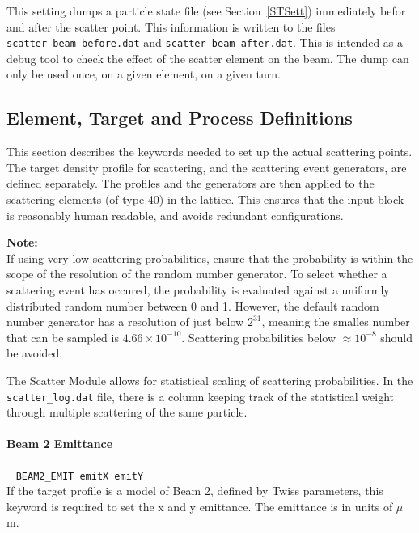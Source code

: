 This setting dumps a particle state file (see Section~\ref{STSett}) immediately befor and after the scatter point.
This information is written to the files \texttt{scatter\_beam\_before.dat} and \texttt{scatter\_beam\_after.dat}.
This is intended as a debug tool to check the effect of the scatter element on the beam.
The dump can only be used once, on a given element, on a given turn.

\subsection{Element, Target and Process Definitions}

This section describes the keywords needed to set up the actual scattering points.
The target density profile for scattering, and the scattering event generators, are defined separately.
The profiles and the generators are then applied to the scattering elements (of type 40) in the lattice.
This ensures that the input block is reasonably human readable, and avoids redundant configurations.

\bigskip
\noindent\textbf{Note:}\\

If using very low scattering probabilities, ensure that the probability is within the scope of the resolution of the random number generator.
To select whether a scattering event has occured, the probability is evaluated against a uniformly distributed random number between 0 and 1.
However, the default random number generator has a resolution of just below $2^{31}$, meaning the smalles number that can be sampled is $4.66\times 10^{-10}$.
Scattering probabilities below $\approx{10^{-8}}$ should be avoided.

The Scatter Module allows for statistical scaling of scattering probabilities.
In the \texttt{scatter\_log.dat} file, there is a column keeping track of the statistical weight through multiple scattering of the same particle.

\paragraph{Beam 2 Emittance}~ \texttt{BEAM2\_EMIT emitX emitY}\\

If the target profile is a model of Beam 2, defined by Twiss parameters, this keyword is required to set the x and y emittance.
The emittance is in units of $\mu$m.

